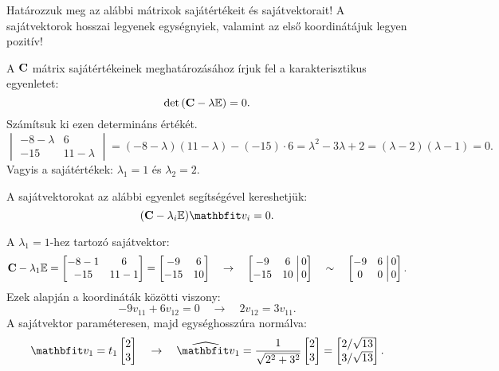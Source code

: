 \begin{exercise}{%
    Határozzuk meg az alábbi mátrixok sajátértékeit és sajátvektorait!
    A sajátvektorok hosszai legyenek egységnyiek, valamint az első koordinátájuk
    legyen pozitív!
  }
{  A $\mathbf{C}$ mátrix sajátértékeinek meghatározásához írjuk fel a
  karakterisztikus egyenletet:
  \[
    \det \left( \mathbf{C} - \lambda {\mathbb{E}} \right) = 0
    \text{.}
  \]
  Számítsuk ki ezen determináns értékét.
  \[
    \begin{vmatrix}
      -8 - \lambda & 6           \\
      -15          & 11 -\lambda
    \end{vmatrix}
    = (-8 - \lambda)(11 - \lambda) - (-15) \cdot 6
    = \lambda^2 - 3\lambda + 2
    = (\lambda - 2)(\lambda - 1)
    = 0
    \text{.}
  \]
  Vagyis a sajátértékek: $\lambda_1 = 1$ és $\lambda_2 = 2$.

  \vspace{.66em}
  A sajátvektorokat az alábbi egyenlet segítségével kereshetjük:
  \[
    (\rmat C - \lambda_i \imat) \rvec v_i = 0
    \text{.}
  \]

  A $\lambda_1 = 1$-hez tartozó sajátvektor:
  \[
    \mathbf{C} - \lambda_1 {\mathbb{E}} = \begin{bmatrix}
      -8 - 1 & 6      \\
      -15    & 11 - 1
    \end{bmatrix} = \begin{bmatrix}
      -9  & 6  \\
      -15 & 10
    \end{bmatrix}
    \quad \rightarrow \quad
    \left[\begin{matrix}
        -9  & 6  \\
        -15 & 10
      \end{matrix}\right.\left|\begin{matrix}
        \,0 \\ \,0
      \end{matrix}\right]
    \quad \sim \quad
    \left[\begin{matrix}
        -9 & 6 \\
        0  & 0
      \end{matrix}\right.\left|\begin{matrix}
        \,0 \\ \,0
      \end{matrix}\right]
    \text{.}
  \]
  Ezek alapján a koordináták közötti viszony:
  \[
    -9v_{11} + 6v_{12} = 0
    \quad \rightarrow \quad
    2 v_{12} = 3 v_{11}
    \text{.}
  \]
  A sajátvektor paraméteresen, majd egységhosszúra normálva:
  \[
    \rvec v_1 = t_1 \begin{bmatrix}
      2 \\ 3
    \end{bmatrix}
    \quad
    \rightarrow
    \quad
    \uvec v_1 = \frac{1}{\sqrt{2^2 + 3^2}}\begin{bmatrix}
      2 \\ 3
    \end{bmatrix} = \begin{bmatrix}
      2 / \sqrt{13} \\
      3 / \sqrt{13}
    \end{bmatrix}
    \text{.}
  \]

}
\end{exercise}
